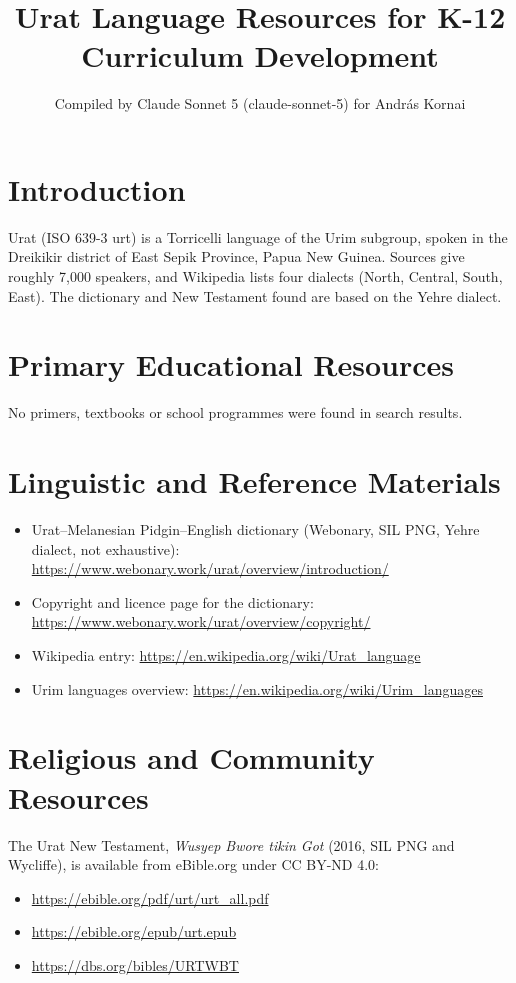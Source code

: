 \documentclass[12pt]{article}
\title{Urat Language Resources for K-12 Curriculum Development}
\author{Compiled by Claude Sonnet 5 (claude-sonnet-5) for Andr\'as Kornai}
\date{}
\begin{document}
\maketitle

\section{Introduction}
Urat (ISO 639-3 urt) is a Torricelli language of the Urim subgroup, spoken in the Dreikikir district of East Sepik Province, Papua New Guinea. Sources give roughly 7,000 speakers, and Wikipedia lists four dialects (North, Central, South, East). The dictionary and New Testament found are based on the Yehre dialect.

\section{Primary Educational Resources}
No primers, textbooks or school programmes were found in search results.

\section{Linguistic and Reference Materials}
\begin{itemize}
\item Urat--Melanesian Pidgin--English dictionary (Webonary, SIL PNG, Yehre dialect, not exhaustive): \url{https://www.webonary.work/urat/overview/introduction/}
\item Copyright and licence page for the dictionary: \url{https://www.webonary.work/urat/overview/copyright/}
\item Wikipedia entry: \url{https://en.wikipedia.org/wiki/Urat_language}
\item Urim languages overview: \url{https://en.wikipedia.org/wiki/Urim_languages}
\end{itemize}

\section{Religious and Community Resources}
The Urat New Testament, \emph{Wusyep Bwore tikin Got} (2016, SIL PNG and Wycliffe), is available from eBible.org under CC BY-ND 4.0:
\begin{itemize}
\item \url{https://ebible.org/pdf/urt/urt_all.pdf}
\item \url{https://ebible.org/epub/urt.epub}
\item \url{https://dbs.org/bibles/URTWBT}
\end{itemize}
\end{document}
